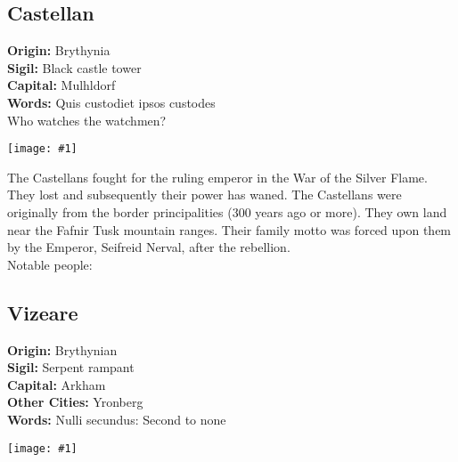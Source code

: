 \documentclass[a4paper]{dnd5}
\newcommand\inc[1]{
 \begin{center}\texttt{[image: \#1]}\end{center}
}
\newcommand\origin{\textbf{Origin: }}
\newcommand\sigil{\textbf{Sigil: }}
\newcommand\words{\textbf{Words: }}
\newcommand\wordsii{\hspace*{4em}}
\newcommand\capital{\textbf{Capital: }}
\newcommand\cities{\textbf{Other Cities: }}
\newcommand\note{\textbf{Notes: }}
\begin{document}
\subsection{Castellan}
\origin Brythynia\\
\sigil Black castle tower\\
\capital Mulhldorf\\
\words Quis custodiet ipsos custodes\\
\wordsii Who watches the watchmen?\\
\inc{castellan.png}

The Castellans fought for the ruling emperor in the War of the Silver Flame.  They lost 
and subsequently their power has waned.  The Castellans were originally from the border principalities (300 years ago or more).  They own land near the Fafnir Tusk mountain ranges.  Their family motto was forced upon them by the Emperor, Seifreid Nerval, after the rebellion.\\


Notable people:



\subsection{Vizeare}
\origin Brythynian\\
\sigil Serpent rampant\\
\capital Arkham\\
\cities Yronberg\\
\words Nulli secundus: Second to none\\
\inc{vizeare.png}
\end{document}
